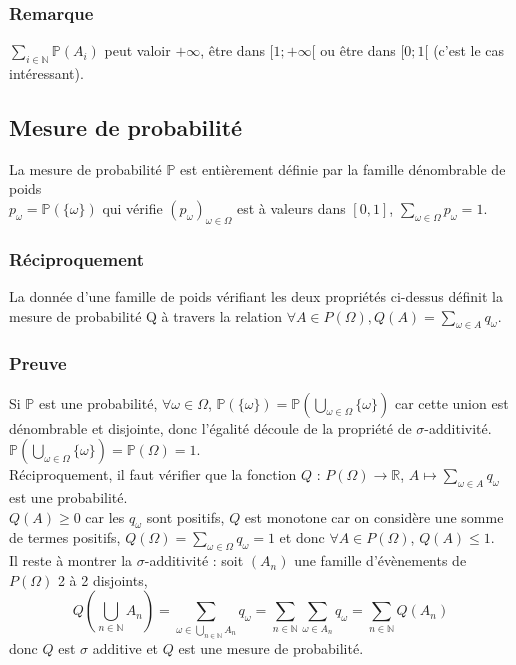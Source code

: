 \documentclass[a4paper,10pt]{book} %
\newcommand{\R}{\mathbb{R}}
\newcommand{\N}{\mathbb{N}}
\renewcommand{\P}{\mathbb{P}} %
\begin{document}
\subsubsection{Remarque}
$\displaystyle \sum_{i\in \N}\P(A_i)$ peut valoir $+\infty$, être dans $[1;+\infty[$ ou être dans $[0;1[$ (c'est le cas intéressant).

\subsection{Mesure de probabilité}
La mesure de probabilité $\P$ est entièrement définie par la famille dénombrable de poids\\ $p_\omega=\P(\{\omega\})$ qui vérifie $(p_\omega)_{\omega\in \Omega}$ est à valeurs dans $[0,1]$, $\displaystyle \sum_{\omega\in \Omega}p_\omega=1$.

\subsubsection{Réciproquement}
La donnée d'une famille de poids vérifiant les deux propriétés ci-dessus définit la mesure de probabilité Q à travers la relation $\displaystyle \forall A\in P(\Omega), Q(A)=\sum_{\omega\in A}q_\omega$.

\subsubsection{Preuve}
Si $\P$ est une probabilité, $\forall \omega\in \Omega$, $\displaystyle \P(\{\omega\})=\P(\bigcup_{\omega\in \Omega}\{\omega\})$ car cette union est dénombrable et disjointe, donc l'égalité découle de la propriété de $\sigma$-additivité. $\displaystyle \P(\bigcup_{\omega\in \Omega}\{\omega\})=\P(\Omega)=1$.\\

Réciproquement, il faut vérifier que la fonction $Q$ : $P(\Omega)\rightarrow \R$, $\displaystyle A\mapsto \sum_{\omega\in A}q_\omega$ est une probabilité.\\
$Q(A)\geq 0$ car les $q_\omega$ sont positifs, $Q$ est monotone car on considère une somme de termes positifs, $\displaystyle Q(\Omega)=\sum_{\omega\in \Omega}q_\omega=1$ et donc $\forall A\in P(\Omega)$, $Q(A)\leq 1$.\\
Il reste à montrer la $\sigma$-additivité : soit $(A_n)$ une famille d'évènements de $P(\Omega)$ 2 à 2 disjoints, $$Q(\bigcup_{n\in \N}A_n)=\sum_{\omega\in\bigcup_{n\in\N}A_n}q_\omega=\sum_{n\in \N}\sum_{\omega\in A_n}q_\omega=\sum_{n\in \N}Q(A_n)$$
donc $Q$ est $\sigma$ additive et $Q$ est une mesure de probabilité.
\end{document}
